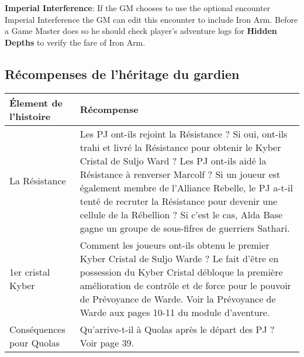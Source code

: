 \documentclass[twoside]{article}
\begin{document}
\textbf{Imperial Interference}:  If the GM chooses to use the optional encounter Imperial Interference the GM can edit this encounter to include Iron Arm.  Before a Game Master does so he should check player's adventure logs for \textbf{Hidden Depths} to verify the fare of Iron Arm.\\


\subsection{Récompenses de l'héritage du gardien}
\renewcommand{\arraystretch}{1.4}
\begin{tabular}{|p{4cm}|p{12cm}|}
	\hline 
	\cellcolor{DarkRed} {\large \textcolor{PureWhite}{\textbf{Élement de l'histoire}}} & \cellcolor{DarkRed} {\large \textcolor{PureWhite}{\textbf{Récompense}}} \\ 
	\hline 
	La Résistance & Les PJ ont-ils rejoint la Résistance ?  Si oui, ont-ils trahi et livré la Résistance pour obtenir le Kyber Cristal de Suljo Ward ?  Les PJ ont-ils aidé la Résistance à renverser Marcolf ?  Si un joueur est également membre de l'Alliance Rebelle, le PJ a-t-il tenté de recruter la Résistance pour devenir une cellule de la Rébellion ?  Si c'est le cas, Alda Base gagne un groupe de sous-fifres de guerriers Sathari. \\ 
	\hline 
	1er cristal Kyber & Comment les joueurs ont-ils obtenu le premier Kyber Cristal de Suljo Warde ?  Le fait d'être en possession du Kyber Cristal débloque la première amélioration de contrôle et de force pour le pouvoir de Prévoyance de Warde.  Voir la Prévoyance de Warde aux pages 10-11 du module d'aventure. \\ 
	\hline 
	Conséquences pour Quolas & Qu'arrive-t-il à Quolas après le départ des PJ ? Voir page 39. \\ 
	\hline 
\end{tabular} 
\end{document}

